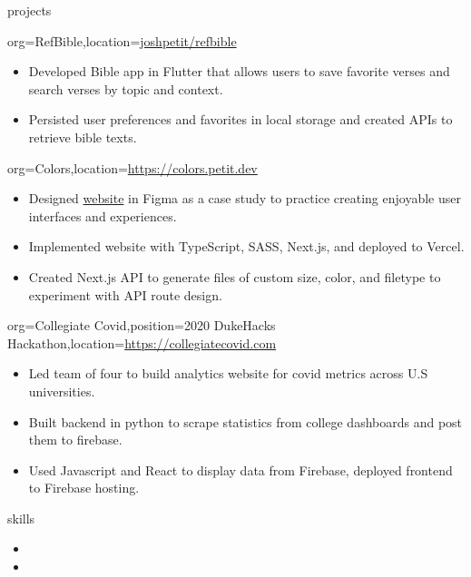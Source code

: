 \documentclass{resume}
\begin{document}
\begin{ResumeSection}{projects}
    \begin{ResumeSubsection}{org={RefBible},location={\href{https://github.com/joshpetit/refbible}{joshpetit/refbible}}}
        \begin{itemize}
            \item {Developed Bible app in Flutter that allows users to save
                favorite verses and search verses by topic and context.} 
            \item {Persisted user preferences and favorites in local storage and
                created APIs to retrieve bible texts.}
        \end{itemize}
    \end{ResumeSubsection}
    \begin{ResumeSubsection}{org={Colors},location={\href{https://colors.petit.dev}{https://colors.petit.dev}}}
        \begin{itemize}
            \item {Designed \href{https://colors.petit.dev}{website}
                in Figma as a case study to practice creating enjoyable user interfaces and experiences.} 
            \item {Implemented website with TypeScript, SASS, Next.js, and deployed to Vercel.}
            \item {Created Next.js API to generate files of custom size, color, and filetype to experiment with API route design.}
        \end{itemize}
    \end{ResumeSubsection}
    \begin{ResumeSubsection}{org={Collegiate Covid},position={2020 DukeHacks Hackathon},location={\href{https://collegiatecovid.com}{https://collegiatecovid.com}}}
        \begin{itemize}
            \item {Led team of four to build analytics website for covid metrics across U.S universities.}
            \item Built backend in python to scrape statistics from college dashboards and post them to firebase.
            \item Used Javascript and React to display data from Firebase, deployed frontend to Firebase hosting.
        \end{itemize}
    \end{ResumeSubsection}
\end{ResumeSection}

\begin{ResumeSection}{skills}
    \begin{ResumeSubsection}{}
        \begin{itemize}
            \item {}
            \item {}
        \end{itemize}
    \end{ResumeSubsection}
\end{ResumeSection}
\end{document}

